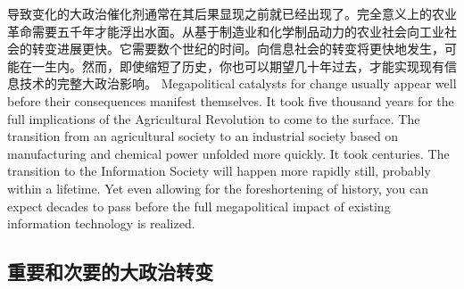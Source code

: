 \begin{paracol}{2}
\switchcolumn*
导致变化的大政治催化剂通常在其后果显现之前就已经出现了。完全意义上的农业革命需要五千年才能浮出水面。从基于制造业和化学制品动力的农业社会向工业社会的转变进展更快。它需要数个世纪的时间。向信息社会的转变将更快地发生，可能在一生内。然而，即使缩短了历史，你也可以期望几十年过去，才能实现现有信息技术的完整大政治影响。
\switchcolumn
Megapolitical catalysts for change usually appear well before their consequences manifest themselves. It took five thousand years for the full implications of the Agricultural Revolution to come to the surface. The transition from an agricultural society to an industrial society based on manufacturing and chemical power unfolded more quickly. It took centuries. The transition to the Information Society will happen more rapidly still, probably within a lifetime. Yet even allowing for the foreshortening of history, you can expect decades to pass before the full megapolitical impact of existing information technology is realized.
\end{paracol}

\subsection{重要和次要的大政治转变}

